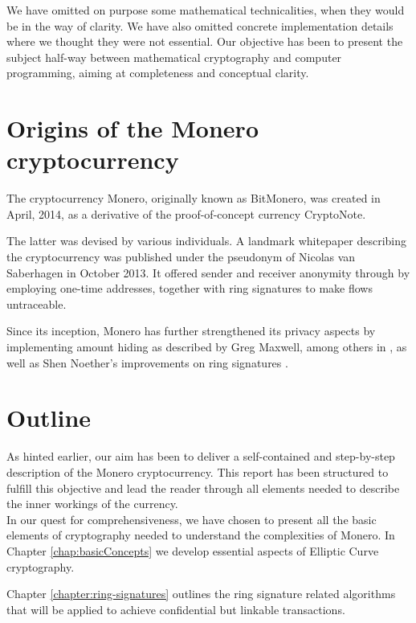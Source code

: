 We have omitted on purpose some mathematical technicalities, when they would be in the way of clarity.
We have also omitted concrete implementation details where we thought they were not essential.
Our objective has been to present the subject half-way between mathematical cryptography and 
computer programming, aiming at completeness and conceptual clarity.



\section{Origins of the Monero cryptocurrency}

The cryptocurrency Monero, originally known as BitMonero, was created in April, 2014, as a derivative of the proof-of-concept currency CryptoNote.

The latter was devised by various individuals. 
A landmark whitepaper describing the cryptocurrency was published under the pseudonym of Nicolas van Saberhagen in October 2013\cite{cryptoNoteWhitePaper}.
It offered sender and receiver anonymity through by employing one-time addresses, together with ring signatures to make 
flows untraceable.

Since its inception, Monero has further strengthened its privacy aspects by implementing amount hiding as described by
Greg Maxwell, among others in \cite{Signatures2015BorromeanRS}, as well as Shen Noether's improvements
on ring signatures \cite{ledger34}.
  

\section{Outline}

As hinted earlier, our aim has been to deliver a self-contained and step-by-step description of the Monero
cryptocurrency. This report has been structured to fulfill this objective and
lead the reader through all elements needed to describe the inner workings of the currency.
\\

In our quest for comprehensiveness, we have chosen to present all the basic elements of cryptography
needed to understand the complexities of Monero. In Chapter \ref{chap:basicConcepts} we develop essential
aspects of Elliptic Curve cryptography.

Chapter \ref{chapter:ring-signatures} outlines the ring signature related algorithms that will be applied to achieve
confidential but linkable transactions.

